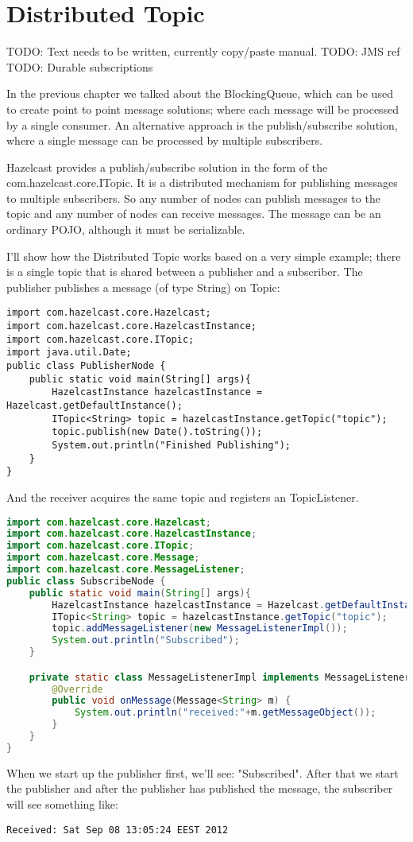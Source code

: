 \chapter{Distributed Topic}

TODO: Text needs to be written, currently copy/paste manual.
TODO: JMS ref
TODO: Durable subscriptions

In the previous chapter we talked about the BlockingQueue, which can be used to create point to point message solutions; where each message will be processed by a single consumer. An alternative approach is the publish/subscribe solution, where a single message can be processed by multiple subscribers.

Hazelcast provides a publish/subscribe solution in the form of the com.hazelcast.core.ITopic. It is a distributed mechanism for publishing messages to multiple subscribers. So any number of nodes can publish messages to the topic and any number of nodes can receive messages. The message can be an ordinary POJO, although it must be serializable. 

I'll show how the Distributed Topic works based on a very simple example; there is a single topic that is shared between a publisher and a subscriber. The publisher publishes a message (of type String) on Topic:
\begin{verbatim}
import com.hazelcast.core.Hazelcast;
import com.hazelcast.core.HazelcastInstance;
import com.hazelcast.core.ITopic;
import java.util.Date;
public class PublisherNode {
    public static void main(String[] args){
        HazelcastInstance hazelcastInstance = Hazelcast.getDefaultInstance();
        ITopic<String> topic = hazelcastInstance.getTopic("topic");
        topic.publish(new Date().toString());
        System.out.println("Finished Publishing");
    }
}
\end{verbatim}

And the receiver acquires the same topic and registers an TopicListener.
\begin{lstlisting}[language=java]
import com.hazelcast.core.Hazelcast;
import com.hazelcast.core.HazelcastInstance;
import com.hazelcast.core.ITopic;
import com.hazelcast.core.Message;
import com.hazelcast.core.MessageListener;
public class SubscribeNode {
    public static void main(String[] args){
        HazelcastInstance hazelcastInstance = Hazelcast.getDefaultInstance();
        ITopic<String> topic = hazelcastInstance.getTopic("topic");
        topic.addMessageListener(new MessageListenerImpl());
        System.out.println("Subscribed");
    }

    private static class MessageListenerImpl implements MessageListener<String> {
        @Override
        public void onMessage(Message<String> m) {
            System.out.println("received:"+m.getMessageObject());
        }
    }
}
\end{lstlisting}
When we start up the publisher first, we'll see: "Subscribed". After that we start the publisher and after the publisher has published the message, the subscriber will see something like:
\begin{verbatim}
Received: Sat Sep 08 13:05:24 EEST 2012
\end{verbatim}

